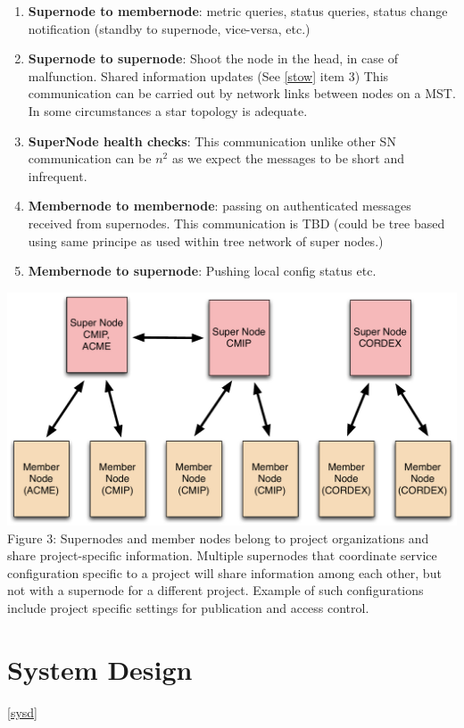 \documentclass[oneside,12pt]{memoir}
\begin{document}
\begin{enumerate}
\item \textbf{Supernode to membernode}: metric queries, status queries, status change notification (standby to supernode, vice-versa, etc.)
\item \textbf{Supernode to supernode}: Shoot the node in the head, in case of malfunction.  Shared information updates (See \ref{stow} item 3)  This communication can be carried out by network links between nodes on a MST.   In some circumstances a star topology is adequate.  
\item \textbf{SuperNode health checks}:  This communication unlike other SN communication can be $n^2$ as we expect the messages to be short and infrequent.  

\item \textbf{Membernode to membernode}: passing on authenticated messages received from supernodes.  This communication is TBD (could be tree based using same principe as used within tree network of super nodes.) %
\item \textbf{Membernode to supernode}: Pushing local config status etc.
\end{enumerate}

\begin{center}
\includegraphics[width=\textwidth]{presentation/ESG-node-org.pdf}
Figure 3: Supernodes and member nodes belong to project organizations and share project-specific information.   Multiple supernodes that coordinate service configuration specific to a project will share information among each other, but not with a supernode for a different project.  Example of such configurations include project specific settings for publication and access control.
\end{center}

\section{System Design}
\ref{sysd}
\end{document}
